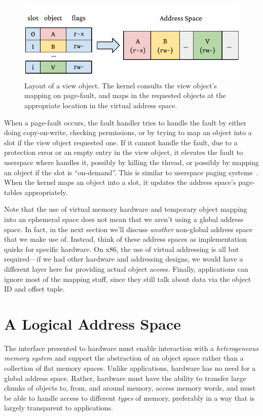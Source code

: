 \begin{figure}
    \centering
    \includegraphics[width=\linewidth]{fig/view}
    \caption[Layout of a view object]{Layout of a view object. The kernel consults the view object's mapping on page-fault,
        and maps in the requested objects at the appropriate location in the virtual address space.}
    \label{fig:view}
\end{figure}

When a page-fault occurs, the fault handler tries to handle the fault by either doing copy-on-write,
checking permissions, or by trying to map an object into a slot if the view object requested one.
If it cannot handle the fault, \eg due to a protection error or an empty entry in the view
object, it elevates the fault to userspace where \libcore handles it, possibly by killing the
thread, or possibly by mapping an object if the slot is ``on-demand''. This is similar to userspace
paging systems~\cite{l4,accetta:usenix86s}. When the kernel
maps an object into a slot, it updates the address space's page-tables appropriately.

Note that the use of virtual memory hardware and temporary object mapping into an ephemeral space does not mean that we
aren't using a global address space. In fact, in the next section we'll discuss \emph{another} non-global address space
that we make use of. Instead, think of these address spaces as implementation quirks for specific hardware. On x86, the
use of virtual addressing is all but required---if we had other hardware and addressing designs, we would have a
different layer here for providing actual object access. Finally, applications can ignore most of the \libcore mapping
stuff, since they still talk about data via the object ID and offset tuple.

\section{A Logical Address Space}

The interface presented to hardware must enable interaction with a
\textit{heterogeneous memory system} and support the abstraction of an object space rather than a
collection of flat memory spaces. Unlike applications, hardware has no need for
a global address space. Rather, hardware must
have the ability to transfer large chunks of objects to, from, and around memory, access memory words, and must be able to
handle access to different \emph{types} of memory, preferably in a way that is largely transparent to
applications.

